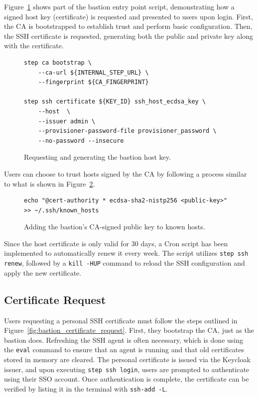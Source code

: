 Figure~\ref{fig:bastion_host_key} shows part of the bastion entry point script, demonstrating how a signed host key (certificate) is requested and presented to users upon login. First, the CA is bootstrapped to establish trust and perform basic configuration. Then, the SSH certificate is requested, generating both the public and private key along with the certificate.

\begin{figure}[h]
    \centering
\begin{verbatim}
step ca bootstrap \
    --ca-url ${INTERNAL_STEP_URL} \
    --fingerprint ${CA_FINGERPRINT}

step ssh certificate ${KEY_ID} ssh_host_ecdsa_key \
    --host  \
    --issuer admin \
    --provisioner-password-file provisioner_password \
    --no-password --insecure
\end{verbatim}
    \caption{Requesting and generating the bastion host key.}
    \label{fig:bastion_host_key}
\end{figure}

Users can choose to trust hosts signed by the CA by following a process similar to what is shown in Figure~\ref{fig:bastion_known_hosts}.

\begin{figure}[h]
    \centering
\begin{verbatim}
echo "@cert-authority * ecdsa-sha2-nistp256 <public-key>" >> ~/.ssh/known_hosts
\end{verbatim}
    \caption{Adding the bastion's CA-signed public key to known hosts.}
    \label{fig:bastion_known_hosts}
\end{figure}

Since the host certificate is only valid for 30 days, a Cron script has been implemented to automatically renew it every week. The script utilizes \texttt{step ssh renew}, followed by a \texttt{kill -HUP} command to reload the SSH configuration and apply the new certificate.

\subsection{Certificate Request}
Users requesting a personal SSH certificate must follow the steps outlined in Figure~\ref{fig:bastion_certificate_request}. First, they bootstrap the CA, just as the bastion does. Refreshing the SSH agent is often necessary, which is done using the \texttt{eval} command to ensure that an agent is running and that old certificates stored in memory are cleared. The personal certificate is issued via the Keycloak issuer, and upon executing \texttt{step ssh login}, users are prompted to authenticate using their SSO account. Once authentication is complete, the certificate can be verified by listing it in the terminal with \texttt{ssh-add -L}.

